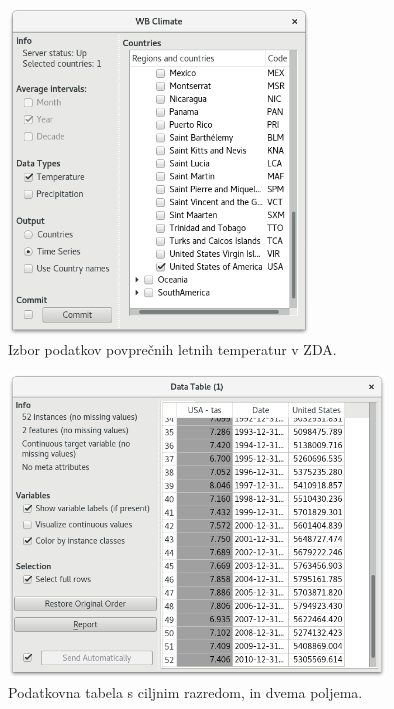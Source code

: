 \begin{figure}
\begin{center}
\includegraphics[width=8cm]{pic/var_climate_select.png}
\end{center}
\caption{Izbor podatkov povprečnih letnih temperatur v ZDA.}
\label{var_climate_select}
\end{figure} 

\begin{figure}
\begin{center}
\includegraphics[width=10cm]{pic/var_data_table.png}
\end{center}
\caption{Podatkovna tabela s ciljnim razredom, in dvema poljema.}
\label{var_data_table}
\end{figure} 

